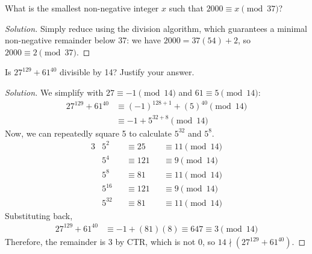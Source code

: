 \question What is the smallest non-negative integer $x$ such that $2000 \equiv x \pmod{37}$?
\begin{proof}[Solution]
  Simply reduce using the division algorithm, which guarantees a minimal non-negative remainder below 37:
  we have $2000 = 37(54) + 2$, so $2000 \equiv 2 \pmod{37}$.
\end{proof}



\question Is $27^{129}+61^{40}$ divisible by 14? Justify your answer.
\begin{proof}[Solution]
  We simplify with $27 \equiv -1 \pmod{14}$ and $61 \equiv 5 \pmod{14}$:
  \begin{align*}
    27^{129}+61^{40} & \equiv (-1)^{128+1}+(5)^{40} \pmod{14} \\
                     & \equiv -1 + 5^{32+8} \pmod{14}
  \end{align*}
  Now, we can repeatedly square 5 to calculate $5^{32}$ and $5^8$.
  \begin{alignat*}{3}
     & 5^2    &  & \equiv 25  &  & \equiv 11 \pmod{14} \\
     & 5^4    &  & \equiv 121 &  & \equiv 9 \pmod{14}  \\
     & 5^8    &  & \equiv 81  &  & \equiv 11 \pmod{14} \\
     & 5^{16} &  & \equiv 121 &  & \equiv 9 \pmod{14}  \\
     & 5^{32} &  & \equiv 81  &  & \equiv 11 \pmod{14}
  \end{alignat*}
  Substituting back,
  \begin{align*}
    27^{129}+61^{40} & \equiv -1 + (81)(8) \equiv 647 \equiv 3 \pmod{14}
  \end{align*}
  Therefore, the remainder is 3 by CTR, which is not 0, so $14 \nmid (27^{129}+61^{40})$.
\end{proof}


